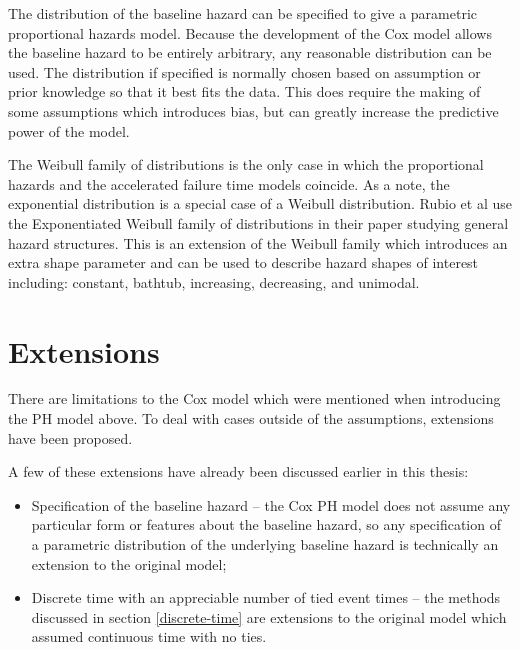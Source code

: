 The distribution of the baseline hazard can be specified to give a parametric proportional hazards model. Because the development of the Cox model allows the baseline hazard to be entirely arbitrary, any reasonable distribution can be used. The distribution if specified is normally chosen based on assumption or prior knowledge so that it best fits the data. This does require the making of some assumptions which introduces bias, but can greatly increase the predictive power of the model.

The Weibull family of distributions is the only case in which the proportional hazards and the accelerated failure time models coincide. As a note, the exponential distribution is a special case of a Weibull distribution. Rubio et al  use the Exponentiated Weibull family of distributions in their paper studying general hazard structures. This is an extension of the Weibull family which introduces an extra shape parameter and can be used to describe hazard shapes of interest including: constant, bathtub, increasing, decreasing, and unimodal.

\iffalse
\subsection{SCART}
\fi
\section{Extensions}\label{extensions}

There are limitations to the Cox model which were mentioned when introducing the PH model above. To deal with cases outside of the assumptions, extensions have been proposed. 

A few of these extensions have already been discussed earlier in this thesis:

\begin{itemize}
    \item Specification of the baseline hazard -- the Cox PH model does not assume any particular form or features about the baseline hazard, so any specification of a parametric distribution of the underlying baseline hazard is technically an extension to the original model;
    \item Discrete time with an appreciable number of tied event times -- the methods discussed in section \ref{discrete-time} are extensions to the original model which assumed continuous time with no ties.
\end{itemize}

